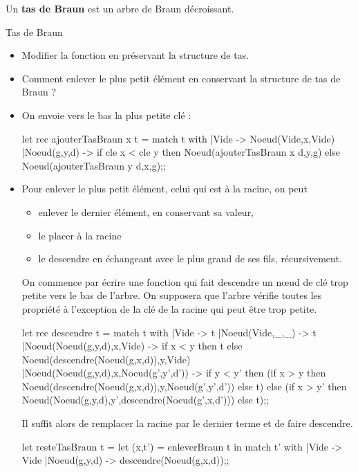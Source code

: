 Un {\bf tas de Braun} est un arbre de Braun décroissant.

\begin{exo}{Tas de Braun}{}
\begin{itemize}
\item Modifier la fonction  en préservant la structure de tas.

\item Comment enlever le plus petit élément en conservant la structure de tas de Braun ?
\end{itemize} 
\reponse
\begin{itemize}
\item On envoie vers le bas la plus petite clé :
\begin{ocaml}
let rec ajouterTasBraun x t =
  match t with
  |Vide -> Noeud(Vide,x,Vide)
  |Noeud(g,y,d) ->  if cle x < cle y
                    then Noeud(ajouterTasBraun x d,y,g)
                    else Noeud(ajouterTasBraun y d,x,g);;
\end{ocaml}

\item Pour enlever le plus petit élément, celui qui est à la racine, on peut

\begin{itemize}
\item enlever le dernier élément, en conservant sa valeur, 
\item le placer à la racine
\item le descendre en échangeant avec le plus grand de ses fils, récursivement.
\end{itemize}
On commence par écrire une fonction qui fait descendre un nœud de clé trop petite vers le bas de l'arbre. On supposera que l'arbre vérifie toutes les propriété à l'exception de la clé de la racine qui peut être trop petite.

\begin{ocaml}
let rec descendre t =
  match t with
  |Vide  -> t
  |Noeud(Vide,_,_) -> t
  |Noeud(Noeud(g,y,d),x,Vide)
   -> if x < y then t
               else Noeud(descendre(Noeud(g,x,d)),y,Vide)
  |Noeud(Noeud(g,y,d),x,Noeud(g',y',d'))
   -> if y < y'
      then (if x > y
            then Noeud(descendre(Noeud(g,x,d)),y,Noeud(g',y',d'))
            else t)
      else (if x > y'
            then Noeud(Noeud(g,y,d),y',descendre(Noeud(g',x,d')))
            else t);;
\end{ocaml}


Il suffit alors de remplacer la racine par le dernier terme et de faire descendre.

\begin{ocaml}
let resteTasBraun t =
  let (x,t') = enleverBraun t in
  match t' with
  |Vide -> Vide
  |Noeud(g,y,d) -> descendre(Noeud(g,x,d));; 
\end{ocaml}
\end{itemize}
\end{exo}
